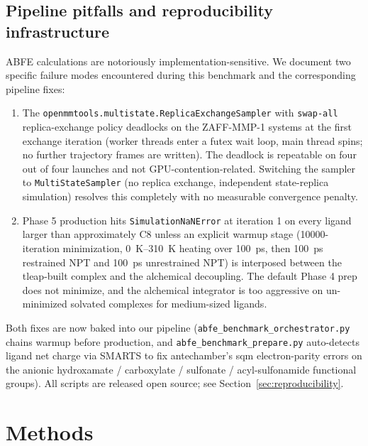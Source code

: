 \documentclass[11pt,a4paper]{article}
\begin{document}
\subsection{Pipeline pitfalls and reproducibility infrastructure}

ABFE calculations are notoriously implementation-sensitive. We document
two specific failure modes encountered during this benchmark and the
corresponding pipeline fixes:

\begin{enumerate}[leftmargin=*]
  \item The \texttt{openmmtools.multistate.ReplicaExchangeSampler} with
    \texttt{swap-all} replica-exchange policy deadlocks on the
    ZAFF-MMP-1 systems at the first exchange iteration (worker threads
    enter a futex wait loop, main thread spins; no further trajectory
    frames are written). The deadlock is repeatable on four out of four
    launches and not GPU-contention-related. Switching the sampler to
    \texttt{MultiStateSampler} (no replica exchange, independent
    state-replica simulation) resolves this completely with no measurable
    convergence penalty.
  \item Phase 5 production hits \texttt{SimulationNaNError} at
    iteration 1 on every ligand larger than approximately C8 unless an
    explicit warmup stage (10000-iteration minimization,
    \SIrange{0}{310}{\kelvin} heating over \SI{100}{\pico\second}, then
    \SI{100}{\pico\second} restrained NPT and \SI{100}{\pico\second}
    unrestrained NPT) is interposed between the tleap-built complex and
    the alchemical decoupling. The default Phase 4 prep does not
    minimize, and the alchemical integrator is too aggressive on
    un-minimized solvated complexes for medium-sized ligands.
\end{enumerate}

Both fixes are now baked into our pipeline (\texttt{abfe\_benchmark\_orchestrator.py}
chains warmup before production, and \texttt{abfe\_benchmark\_prepare.py}
auto-detects ligand net charge via SMARTS to fix antechamber's sqm
electron-parity errors on the anionic hydroxamate / carboxylate /
sulfonate / acyl-sulfonamide functional groups). All scripts are
released open source; see Section~\ref{sec:reproducibility}.

\section{Methods}
\label{sec:methods}
\end{document}
